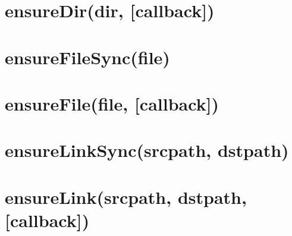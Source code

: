 \documentclass[twoside]{book}
\newcommand{\+}{\discretionary{\mbox{\scriptsize$\hookleftarrow$}}{}{}}
\begin{document}
\chapter{ensure\+Dir(dir, \mbox{[}callback\mbox{]})}
\label{md_dsmacc_examples_DRmerge_node_modules_electron-packager_node_modules_fs-extra_docs_ensureDir}

\chapter{ensure\+File\+Sync(file)}
\label{md_dsmacc_examples_DRmerge_node_modules_electron-packager_node_modules_fs-extra_docs_ensureFile-sync}

\chapter{ensure\+File(file, \mbox{[}callback\mbox{]})}
\label{md_dsmacc_examples_DRmerge_node_modules_electron-packager_node_modules_fs-extra_docs_ensureFile}

\chapter{ensure\+Link\+Sync(srcpath, dstpath)}
\label{md_dsmacc_examples_DRmerge_node_modules_electron-packager_node_modules_fs-extra_docs_ensureLink-sync}

\chapter{ensure\+Link(srcpath, dstpath, \mbox{[}callback\mbox{]})}
\label{md_dsmacc_examples_DRmerge_node_modules_electron-packager_node_modules_fs-extra_docs_ensureLink}

\end{document}
